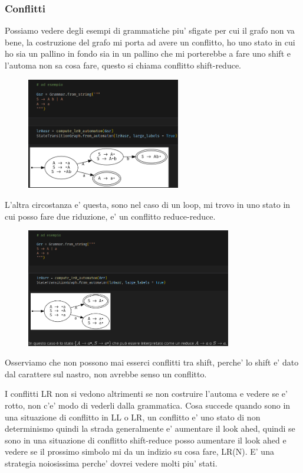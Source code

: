 \subsubsection{Conflitti}
Possiamo vedere degli esempi di grammatiche piu' sfigate per cui il grafo non va bene, la costruzione del grafo mi porta ad avere un conflitto, ho uno stato in cui ho sia un pallino in fondo sia in un pallino che mi porterebbe a fare uno shift e l'automa non sa cosa fare, questo si chiama conflitto shift-reduce.

\begin{figure}[ht!]
  \centering
  \includegraphics[width=0.6\textwidth]{images/Parsing/conflitto_shift_reduce.png}
\end{figure}

L'altra circostanza e' questa, sono nel caso di un loop, mi trovo in uno stato in cui posso fare due riduzione, e' un conflitto reduce-reduce.

\begin{figure}[ht!]
  \centering
  \includegraphics[width=0.8\textwidth]{images/Parsing/conflitto_reduce_reduce.png}
\end{figure}
Osserviamo che non possono mai esserci conflitti tra shift, perche' lo shift e' dato dal carattere sul nastro, non avrebbe senso un conflitto.

I conflitti LR non si vedono altrimenti se non costruire l'automa e vedere se e' rotto, non c'e' modo di vederli dalla grammatica. 
Cosa succede quando sono in una situazione di conflitto in LL o LR, un conflitto e' uno stato di non determinismo quindi la strada generalmente e' aumentare il look ahed, quindi se sono in una situazione di conflitto shift-reduce posso aumentare il look ahed e vedere se il prossimo simbolo mi da un indizio su cosa fare, LR(N). E' una strategia noiosissima perche' dovrei vedere molti piu' stati.


